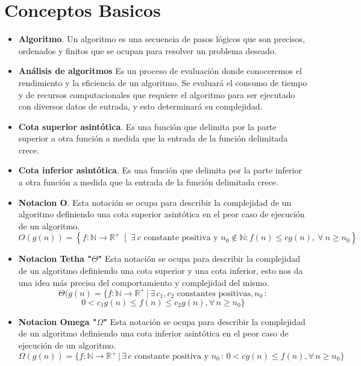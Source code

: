 \documentclass[12pt,twoside]{article}
\begin{document}
\newpage


\section{Conceptos Basicos}

\begin{itemize}
\item \textbf{Algoritmo}. Un algoritmo es una secuencia de pasos lógicos que son precisos, ordenados y finitos que se ocupan para resolver un problema deseado.

\item \textbf{Análisis de  algoritmos}
Es un proceso de evaluación donde conoceremos el rendimiento y la eficiencia de un algoritmo. Se evaluará el consumo de tiempo y de recursos computacionales que requiere el algoritmo para ser ejecutado con diversos datos de entrada, y esto determinará su complejidad.

\item \textbf{Cota superior asintótica}. Es una función que delimita por la parte superior a otra función a medida que la entrada de la función delimitada crece.

\item \textbf{Cota inferior asintótica}. Es una función que delimita por la parte inferior a otra función a medida que la entrada de la función delimitada crece.

\item \textbf{Notacion O}. Esta notación se ocupa para describir la complejidad de un algoritmo definiendo una cota superior asintótica en el peor caso de ejecución de un algoritmo.
\\
\[O(g(n)) = \left\{ f : \mathbb{N} \rightarrow \mathbb{R}^+ \ \middle| \ \exists \ c \text{ constante positiva y } n_0 \notin \mathbb{N} : f(n) \leq cg(n), \ \forall \ n \geq n_0 \right\}\]


\item \textbf{Notacion Tetha "$\Theta$"} Esta notación se ocupa para describir la complejidad de un algoritmo definiendo una cota superior y una cota inferior, esto nos da una idea más precisa del comportamiento y complejidad del mismo.
\\
\[\Theta(g(n) = \{f : \mathbb{N} \rightarrow \mathbb{R}^+ \,|\, \exists \, c_1, c_2 \text{ constantes positivas}, n_0 \,: \]
\[0 < c_1g(n) \leq f(n) \leq c_2g(n), \forall \, n \geq n_0\}\]

\item \textbf{Notacion Omega "$\Omega$"}  Esta notación se ocupa para describir la complejidad de un algoritmo definiendo una cota inferior asintótica en el peor caso de ejecución de un algoritmo.
\\
\[\Omega(g(n)) = \{f : \mathbb{N} \rightarrow \mathbb{R}^+ \,|\, \exists \, c \text{ constante positiva y } n_0 \,:\, 0 < cg(n) \leq f(n), \forall \, n \geq n_0\}\]



\end{itemize}
\end{document}
